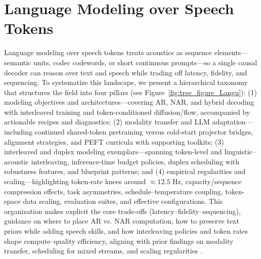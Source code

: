 \documentclass{article}
\begin{document}
\section{Language Modeling over Speech Tokens} \label{sec:languagemodelingoverspeechtokens}
Language modeling over speech tokens treats acoustics as sequence elements---semantic units, codec codewords, or short continuous prompts---so a single causal decoder can reason over text and speech while trading off latency, fidelity, and sequencing. To systematize this landscape, we present a hierarchical taxonomy that structures the field into four pillars (see Figure~\ref{fig:tree_figure_Langu}): (1) modeling objectives and architectures---covering AR, NAR, and hybrid decoding with interleaved training and token-conditioned diffusion/flow, accompanied by actionable recipes and diagnostics; (2) modality transfer and LLM adaptation---including continued shared-token pretraining versus cold-start projector bridges, alignment strategies, and PEFT curricula with supporting toolkits; (3) interleaved and duplex modeling exemplars---spanning token-level and linguistic--acoustic interleaving, inference-time budget policies, duplex scheduling with robustness features, and blueprint patterns; and (4) empirical regularities and scaling---highlighting token-rate knees around $\approx 12.5$ Hz, capacity/sequence compression effects, task asymmetries, schedule--temperature coupling, token-space data scaling, evaluation suites, and effective configurations. This organization makes explicit the core trade-offs (latency--fidelity--sequencing), guidance on where to place AR vs. NAR computation, how to preserve text priors while adding speech skills, and how interleaving policies and token rates shape compute--quality efficiency, aligning with prior findings on modality transfer, scheduling for mixed streams, and scaling regularities \cite{zeng2024scalingspeechtextpretrainingsyntheticint,wang2025tadicodectextawarediffusionspeechtokeniz}.

\end{document}
